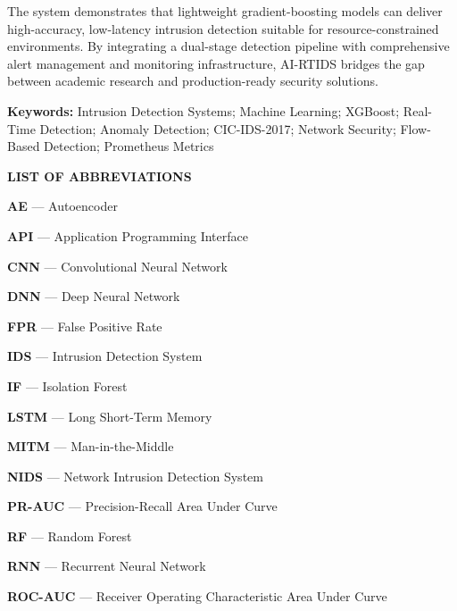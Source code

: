 \documentclass[12pt,a4paper]{report}
\begin{document}
The system demonstrates that lightweight gradient-boosting models can deliver high-accuracy, low-latency intrusion detection suitable for resource-constrained environments. By integrating a dual-stage detection pipeline with comprehensive alert management and monitoring infrastructure, AI-RTIDS bridges the gap between academic research and production-ready security solutions.

\vspace{0.3cm}
\noindent\textbf{Keywords:} Intrusion Detection Systems; Machine Learning; XGBoost; Real-Time Detection; Anomaly Detection; CIC-IDS-2017; Network Security; Flow-Based Detection; Prometheus Metrics

\newpage
\tableofcontents
\newpage
\listoftables
\newpage
\listoffigures

\newpage
\begin{center}
    {\fontsize{14}{17}\selectfont\textbf{LIST OF ABBREVIATIONS}}
\end{center}
\vspace{0.5cm}

\noindent
\textbf{AE} --- Autoencoder

\noindent
\textbf{API} --- Application Programming Interface

\noindent
\textbf{CNN} --- Convolutional Neural Network

\noindent
\textbf{DNN} --- Deep Neural Network

\noindent
\textbf{FPR} --- False Positive Rate

\noindent
\textbf{IDS} --- Intrusion Detection System

\noindent
\textbf{IF} --- Isolation Forest

\noindent
\textbf{LSTM} --- Long Short-Term Memory

\noindent
\textbf{MITM} --- Man-in-the-Middle

\noindent
\textbf{NIDS} --- Network Intrusion Detection System

\noindent
\textbf{PR-AUC} --- Precision-Recall Area Under Curve

\noindent
\textbf{RF} --- Random Forest

\noindent
\textbf{RNN} --- Recurrent Neural Network

\noindent
\textbf{ROC-AUC} --- Receiver Operating Characteristic Area Under Curve
\end{document}
